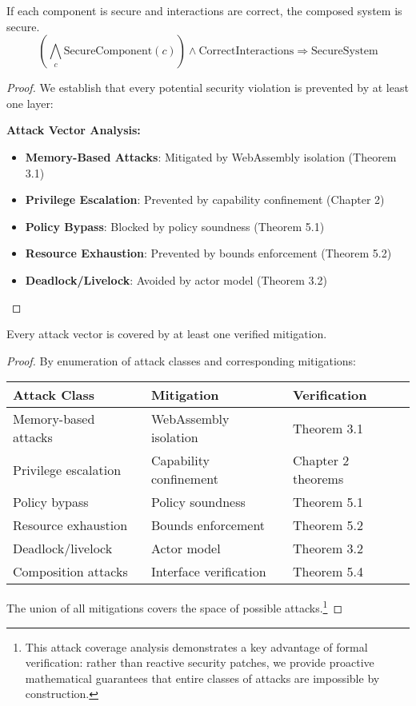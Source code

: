 \begin{theorem}
\label{thm:security-composition}
If each component is secure and interactions are correct, the composed system is secure.
$$\left(\bigwedge_{c} \text{SecureComponent}(c)\right) \land \text{CorrectInteractions} \Rightarrow \text{SecureSystem}$$
\end{theorem}

\begin{proof}
We establish that every potential security violation is prevented by at least one layer:

\textbf{Attack Vector Analysis:}
\begin{itemize}
\item \textbf{Memory-Based Attacks}: Mitigated by WebAssembly isolation (Theorem 3.1)
\item \textbf{Privilege Escalation}: Prevented by capability confinement (Chapter 2)
\item \textbf{Policy Bypass}: Blocked by policy soundness (Theorem 5.1)
\item \textbf{Resource Exhaustion}: Prevented by bounds enforcement (Theorem 5.2)
\item \textbf{Deadlock/Livelock}: Avoided by actor model (Theorem 3.2)
\end{itemize}
\end{proof}

\begin{theorem}
\label{thm:attack-coverage}
Every attack vector is covered by at least one verified mitigation.
\end{theorem}

\begin{proof}
By enumeration of attack classes and corresponding mitigations:

\begin{center}
\begin{tabular}{@{}lll@{}}
\toprule
Attack Class & Mitigation & Verification \\
\midrule
Memory-based attacks & WebAssembly isolation & Theorem 3.1 \\
Privilege escalation & Capability confinement & Chapter 2 theorems \\
Policy bypass & Policy soundness & Theorem 5.1 \\
Resource exhaustion & Bounds enforcement & Theorem 5.2 \\
Deadlock/livelock & Actor model & Theorem 3.2 \\
Composition attacks & Interface verification & Theorem 5.4 \\
\bottomrule
\end{tabular}
\end{center}

The union of all mitigations covers the space of possible attacks.\footnote{This attack coverage analysis demonstrates a key advantage of formal verification: rather than reactive security patches, we provide proactive mathematical guarantees that entire classes of attacks are impossible by construction.}
\end{proof}


